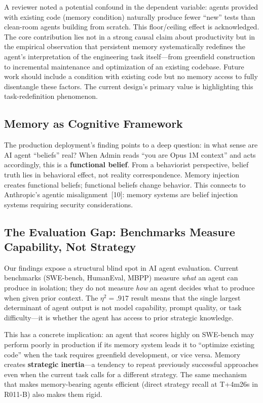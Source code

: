 \documentclass[11pt, a4paper]{article}
\begin{document}
A reviewer noted a potential confound in the dependent variable: agents provided with existing code (memory condition) naturally produce fewer ``new'' tests than clean-room agents building from scratch. This floor/ceiling effect is acknowledged. The core contribution lies not in a strong causal claim about productivity but in the empirical observation that persistent memory systematically redefines the agent's interpretation of the engineering task itself---from greenfield construction to incremental maintenance and optimization of an existing codebase. Future work should include a condition with existing code but no memory access to fully disentangle these factors. The current design's primary value is highlighting this task-redefinition phenomenon.

\subsection{Memory as Cognitive Framework}

The production deployment's finding points to a deep question: in what sense are AI agent ``beliefs'' real? When Admin reads ``you are Opus 1M context'' and acts accordingly, this is a \textbf{functional belief}. From a behaviorist perspective, belief truth lies in behavioral effect, not reality correspondence. Memory injection creates functional beliefs; functional beliefs change behavior. This connects to Anthropic's agentic misalignment~[10]: memory systems are belief injection systems requiring security considerations.

\subsection{The Evaluation Gap: Benchmarks Measure Capability, Not Strategy}

Our findings expose a structural blind spot in AI agent evaluation. Current benchmarks (SWE-bench, HumanEval, MBPP) measure \emph{what} an agent can produce in isolation; they do not measure \emph{how} an agent decides what to produce when given prior context. The $\eta^2 = .917$ result means that the single largest determinant of agent output is not model capability, prompt quality, or task difficulty---it is whether the agent has access to prior strategic knowledge.

This has a concrete implication: an agent that scores highly on SWE-bench may perform poorly in production if its memory system leads it to ``optimize existing code'' when the task requires greenfield development, or vice versa. Memory creates \textbf{strategic inertia}---a tendency to repeat previously successful approaches even when the current task calls for a different strategy. The same mechanism that makes memory-bearing agents efficient (direct strategy recall at T+4m26s in R011-B) also makes them rigid.
\end{document}
